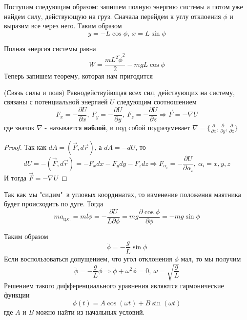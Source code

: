 Поступим следующим образом: запишем полную энергию системы а потом уже найдем силу, действующую на груз. Сначала перейдем к углу отклоения $\phi$ и выразим все через него. Таким образом
\begin{equation*}
    y = -L\cos \phi,\ x = L \sin \phi
\end{equation*} 

Полная энергия системы равна
\begin{equation*}
    W = \frac{m L^2 \dot{\phi}^2}{2} - mgL \cos \phi
\end{equation*}
Теперь запишем теорему, которая нам пригодится
\begin{theorem}(Связь силы и поля)
    Равнодействуйющая всех сил, действующих на систему, связаны с потенциальной энергией $U$ следующим соотношением
    \begin{equation*}
        F_x = -\frac{\partial U}{\partial x},\ F_y = -\frac{\partial U}{\partial y},\ F_z = -\frac{\partial U}{\partial z} \Rightarrow \vec{F} = - \nabla U
    \end{equation*}
    где значок $\nabla$ - называется \textbf{наблой}, и под собой подразумевает $\nabla = \{\frac{\partial}{\partial x},\frac{\partial}{\partial y}, \frac{\partial}{\partial z} \}$
\end{theorem}
\begin{proof}
    Так как $dA = (\vec{F}, d \vec{r})$, а $dA = - dU$, то 
    \begin{equation*}
        dU = -(\vec{F}, d \vec{r}) = - F_x dx - F_y dy - F_z dz \Rightarrow F_{\alpha_i} = - \frac{\partial U}{\partial \alpha_i},\ \alpha_i = {x, y, z}
    \end{equation*}
    И тогда $\vec{F} = - \nabla U$
\end{proof}
Так как мы "сидим"\ в угловых координатах, то изменение положения маятника будет происходить по дуге. Тогда
\begin{equation*}
    m a_{\text{ц.с.}} = m l \ddot{\phi} = - \frac{\partial U}{L \partial \phi} = mg \frac{\partial \cos \phi}{\partial \phi } = - mg \sin \phi
\end{equation*}

Таким образом
\begin{equation*}
    \ddot{\phi} = - \frac{g}{L} \sin \phi
\end{equation*}
Если воспользоваться допущением, что угол отклонения $\phi$ мал, то мы получим
\begin{equation*}
    \ddot{\phi} = - \frac{g}{L} \phi \Rightarrow \ddot{\phi} + \omega^2 \phi = 0,\ \omega = \sqrt{\frac{g}{L}}
\end{equation*}
Решением такого дифференциального уравнения являются гармонические функции
\begin{equation*}
    \phi(t) = A \cos (\omega t) + B \sin (\omega t)
\end{equation*}
где $A$ и $B$ можно найти из начальных условий. 

